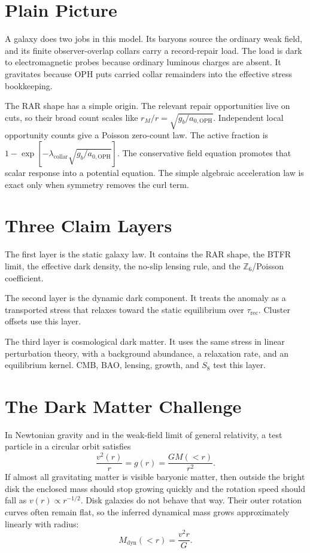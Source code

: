 \documentclass[11pt]{article}
\newcommand{\aoph}{a_{0,\mathrm{OPH}}}
\newcommand{\lambdac}{\lambda_{\mathrm{collar}}}
\newcommand{\Zsix}{\mathbb Z_6}
\begin{document}
\tableofcontents

\section{Plain Picture}

A galaxy does two jobs in this model.  Its baryons source the ordinary weak
field, and its finite observer-overlap collars carry a record-repair load.  The
load is dark to electromagnetic probes because ordinary luminous charges are
absent.  It gravitates because OPH puts carried collar remainders into the
effective stress bookkeeping.

The RAR shape has a simple origin.  The relevant repair opportunities live on
cuts, so their broad count scales like \(r_M/r=\sqrt{g_b/\aoph}\).  Independent
local opportunity counts give a Poisson zero-count law.  The active fraction is
\(1-\exp[-\lambdac\sqrt{g_b/\aoph}]\).  The conservative field equation
promotes that scalar response into a potential equation.  The simple algebraic
acceleration law is exact only when symmetry removes the curl term.

\section{Three Claim Layers}

The first layer is the static galaxy law.  It contains the RAR shape, the
BTFR limit, the effective dark density, the no-slip lensing rule, and the
\(\Zsix\)/Poisson coefficient.

The second layer is the dynamic dark component.  It treats the anomaly as a
transported stress that relaxes toward the static equilibrium over
\(\tau_{\mathrm{rec}}\).  Cluster offsets use this layer.

The third layer is cosmological dark matter.  It uses the same stress in
linear perturbation theory, with a background abundance, a relaxation rate,
and an equilibrium kernel.  CMB, BAO, lensing, growth, and \(S_8\) test this
layer.

\section{The Dark Matter Challenge}

In Newtonian gravity and in the weak-field limit of general relativity, a
test particle in a circular orbit satisfies
\begin{equation}
  \frac{v^2(r)}{r}=g(r)=\frac{G M(<r)}{r^2}.
\end{equation}
If almost all gravitating matter is visible baryonic matter, then outside the
bright disk the enclosed mass should stop growing quickly and the rotation
speed should fall as \(v(r)\propto r^{-1/2}\).  Disk galaxies do not behave
that way.  Their outer rotation curves often remain flat, so the inferred
dynamical mass grows approximately linearly with radius:
\begin{equation}
  M_{\mathrm{dyn}}(<r)=\frac{v^2 r}{G}.
\end{equation}
\end{document}

